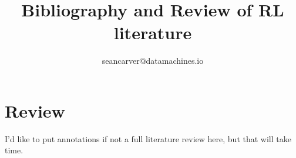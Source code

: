 \documentclass{article}
\title{Bibliography and Review of RL literature}
\author{seancarver@datamachines.io}
\begin{document}
\maketitle

\section{Review}

I'd like to put annotations if not a full literature review here, but that will take time.

\nocite{*}



\end{document}
